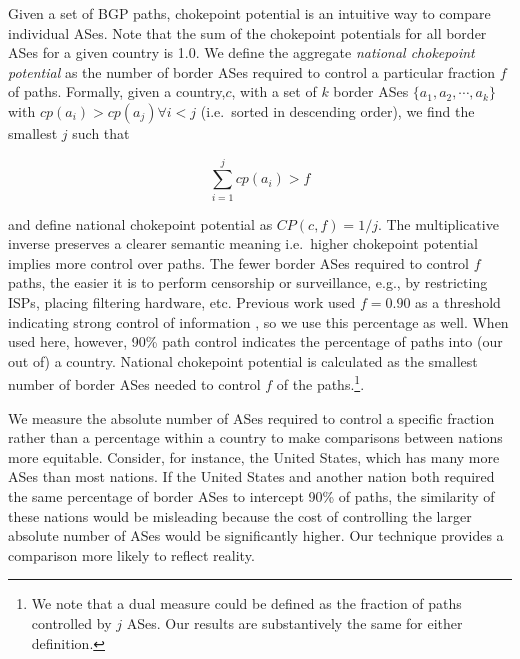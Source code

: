 Given a set of BGP paths, chokepoint potential is an intuitive way to
compare individual ASes. Note that the sum of the chokepoint potentials
for all border ASes for a given country is 1.0.
We define the aggregate \emph{national chokepoint potential} as the number of
border ASes required to control a particular fraction $f$ of paths. Formally,
given a country,$c$, with a set of $k$ border ASes $\{a_1,a_2,\cdots,a_k\}$ with
$cp(a_i)>cp(a_j) \forall i<j$ (i.e.\ sorted in descending order), we find the smallest $j$ such that 

\begin{equation}
  \label{eq:nationalchokepoint}
  \sum_{i=1}^j cp(a_i) > f
\end{equation}

and define national chokepoint potential as $CP(c,f) = 1/j$. The
multiplicative inverse preserves a clearer semantic meaning i.e.\ higher
chokepoint potential implies more control over paths. The fewer border ASes
required to control $f$ paths, the easier it is to perform
censorship or surveillance, e.g., by restricting ISPs,
placing filtering hardware, etc. 
Previous work used $f=0.90$ as a threshold indicating strong control of information
\cite{throats}, so we use this percentage as well. When used here, however,
90\% path control indicates the percentage of paths into (our out of) a country.
National chokepoint potential is calculated
as the smallest number of
border ASes needed to control $f$ of the paths.\footnote{We note that a dual measure
could be defined as the fraction of paths controlled by $j$ ASes. Our results
are substantively the same for either definition.}. 

We measure the absolute number of ASes required to control a specific
fraction rather than a percentage within a country to make
comparisons between nations more equitable.
Consider, for instance, the United States, which has many more ASes than
most nations. If the United States and another nation both required the same
percentage of border ASes to intercept 90\% of paths, the similarity of these
nations would be misleading because the cost of controlling the larger absolute number of ASes
would be significantly higher. Our technique provides a comparison more likely to
reflect reality. 

